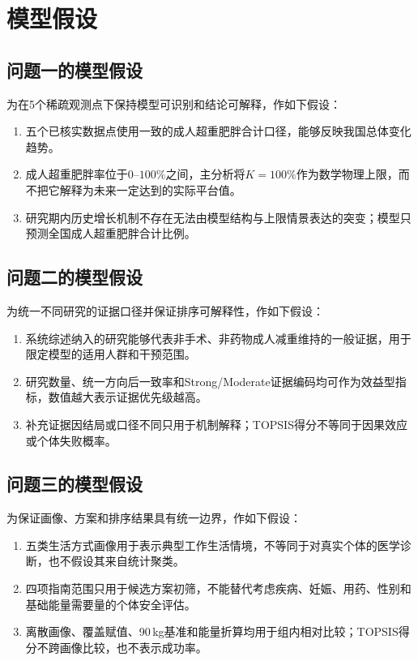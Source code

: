 \section{模型假设}

\subsection{问题一的模型假设}

为在5个稀疏观测点下保持模型可识别和结论可解释，作如下假设：

\begin{enumerate}[label=(\arabic*),leftmargin=2em]
  \item 五个已核实数据点使用一致的成人超重肥胖合计口径，能够反映我国总体变化趋势。
  \item 成人超重肥胖率位于$0$--$100\%$之间，主分析将$K=100\%$作为数学物理上限，而不把它解释为未来一定达到的实际平台值。
  \item 研究期内历史增长机制不存在无法由模型结构与上限情景表达的突变；模型只预测全国成人超重肥胖合计比例。
\end{enumerate}

\subsection{问题二的模型假设}

为统一不同研究的证据口径并保证排序可解释性，作如下假设：

\begin{enumerate}[label=(\arabic*),leftmargin=2em]
  \item 系统综述纳入的研究能够代表非手术、非药物成人减重维持的一般证据，用于限定模型的适用人群和干预范围。
  \item 研究数量、统一方向后一致率和Strong/Moderate证据编码均可作为效益型指标，数值越大表示证据优先级越高。
  \item 补充证据因结局或口径不同只用于机制解释；TOPSIS得分不等同于因果效应或个体失败概率。
\end{enumerate}

\subsection{问题三的模型假设}

为保证画像、方案和排序结果具有统一边界，作如下假设：

\begin{enumerate}[label=(\arabic*),leftmargin=2em]
  \item 五类生活方式画像用于表示典型工作生活情境，不等同于对真实个体的医学诊断，也不假设其来自统计聚类。
  \item 四项指南范围只用于候选方案初筛，不能替代考虑疾病、妊娠、用药、性别和基础能量需要量的个体安全评估。
  \item 离散画像、覆盖赋值、90\,kg基准和能量折算均用于组内相对比较；TOPSIS得分不跨画像比较，也不表示成功率。
\end{enumerate}

